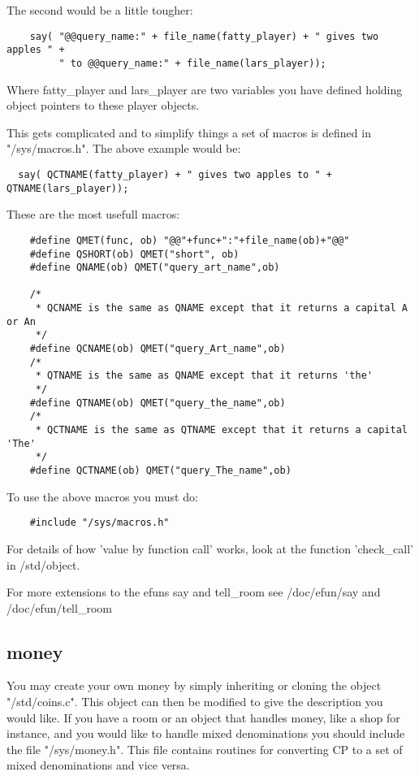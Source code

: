 The second would be a little tougher:

\begin{verbatim}
    say( "@@query_name:" + file_name(fatty_player) + " gives two apples " +
         " to @@query_name:" + file_name(lars_player));
\end{verbatim}

    Where fatty\_player and lars\_player are two variables you have defined
    holding object pointers to these player objects.

This gets complicated and to simplify things a set of macros is defined in
"/sys/macros.h". The above example would be:

\begin{verbatim}
  say( QCTNAME(fatty_player) + " gives two apples to " + QTNAME(lars_player));
\end{verbatim}

These are the most usefull macros:

\begin{verbatim}
    #define QMET(func, ob) "@@"+func+":"+file_name(ob)+"@@"
    #define QSHORT(ob) QMET("short", ob)
    #define QNAME(ob) QMET("query_art_name",ob)

    /*
     * QCNAME is the same as QNAME except that it returns a capital A or An
     */
    #define QCNAME(ob) QMET("query_Art_name",ob)
    /*
     * QTNAME is the same as QNAME except that it returns 'the'
     */
    #define QTNAME(ob) QMET("query_the_name",ob)
    /*
     * QCTNAME is the same as QTNAME except that it returns a capital 'The'
     */
    #define QCTNAME(ob) QMET("query_The_name",ob)
\end{verbatim}

To use the above macros you must do:

\begin{verbatim}
    #include "/sys/macros.h"
\end{verbatim}

For details of how 'value by function call' works, look at the function 
'check\_call' in /std/object. 

For more extensions to the efuns say and tell\_room see 
/doc/efun/say and /doc/efun/tell\_room



\subsection{money}

You may create your own money by simply inheriting or cloning the
object "/std/coins.c". This object can then be modified to give the
description you would like. If you have a room or an object that
handles money, like a shop for instance, and you would like to handle
mixed denominations you should include the file "/sys/money.h". This
file contains routines for converting CP to a set of mixed
denominations and vice versa.

